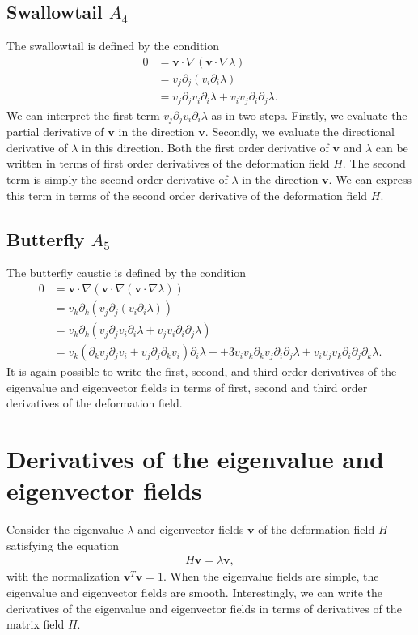 \documentclass{article}
\begin{document}
\subsection{Swallowtail $A_4$}
The swallowtail is defined by the condition
\begin{align}
0
&= \bm{v} \cdot \nabla (\bm{v} \cdot \nabla \lambda)\\
&= v_j \partial_j(v_i \partial_i \lambda)\\
&= v_j \partial_j v_i \partial_i \lambda + v_i v_j   \partial_i \partial_j \lambda.
\end{align}
We can interpret the first term $v_j \partial_j v_i \partial_i \lambda $ as in two steps. Firstly, we evaluate the partial derivative of $\bm{v}$ in the direction $\bm{v}$. Secondly, we evaluate the directional derivative of $\lambda$ in this direction. Both the first order derivative of $\bm{v}$ and $\lambda$ can be written in terms of first order derivatives of the deformation field $H$. The second term is simply the second order derivative of $\lambda$ in the direction $\bm{v}$. We can express this term in terms of the second order derivative of the deformation field $H$.



\subsection{Butterfly $A_5$}
The butterfly caustic is defined by the condition
\begin{align}
0
&=\bm{v}\cdot \nabla( \bm{v} \cdot \nabla (\bm{v} \cdot \nabla \lambda))\\
&= v_k \partial_k(v_j \partial_j(v_i \partial_i \lambda))\\
&= v_k \partial_k(v_j \partial_j v_i \partial_i \lambda + v_j  v_i \partial_i \partial_j \lambda)\\
&= 
v_k (\partial_k v_j \partial_j v_i + v_j \partial_j\partial_k v_i)\partial_i \lambda + 
+ 3 v_i v_k \partial_k v_j \partial_i \partial_j \lambda
+ v_i v_j v_k \partial_i \partial_j \partial_k \lambda.
\end{align}
It is again possible to write the first, second, and third order derivatives of the eigenvalue and eigenvector fields in terms of first, second and third order derivatives of the deformation field. 

\section{Derivatives of the eigenvalue and eigenvector fields}
Consider the eigenvalue $\lambda$ and eigenvector fields $\bm{v}$ of the deformation field $H$ satisfying the equation
\begin{align}
H \bm{v} = \lambda \bm{v},
\end{align}
with the normalization $\bm{v}^T\bm{v}=1$. When the eigenvalue fields are simple, the eigenvalue and eigenvector fields are smooth. Interestingly, we can write the derivatives of the eigenvalue and eigenvector fields in terms of derivatives of the matrix field $H$.
\end{document}
